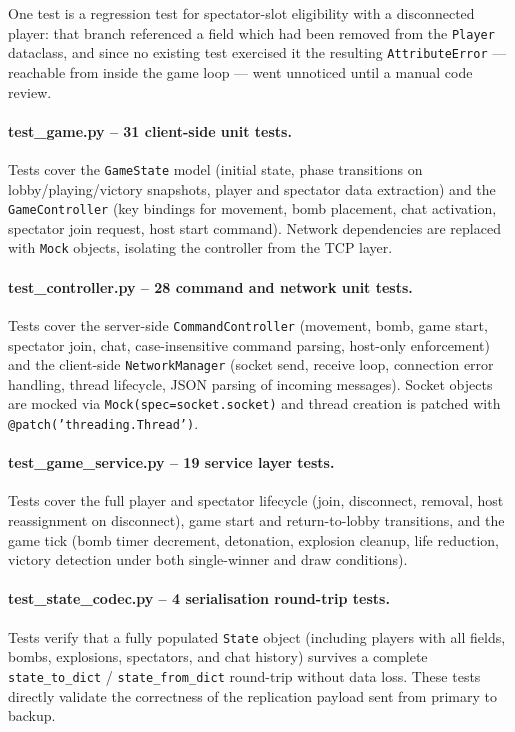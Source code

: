 \documentclass{scrartcl}
\begin{document}
One test is a regression test for spectator-slot eligibility with a disconnected
player: that branch referenced a field which had been removed from the
\texttt{Player} dataclass, and since no existing test exercised it the resulting
\texttt{AttributeError} --- reachable from inside the game loop --- went unnoticed
until a manual code review.

\paragraph{test\_game.py -- 31 client-side unit tests.}
Tests cover the \texttt{GameState} model (initial state, phase transitions on lobby/playing/victory snapshots, player and spectator data extraction) and the \texttt{GameController} (key bindings for movement, bomb placement, chat activation, spectator join request, host start command).
Network dependencies are replaced with \texttt{Mock} objects, isolating the controller from the TCP layer.

\paragraph{test\_controller.py -- 28 command and network unit tests.}
Tests cover the server-side \texttt{CommandController} (movement, bomb, game start, spectator join, chat, case-insensitive command parsing, host-only enforcement) and the client-side \texttt{NetworkManager} (socket send, receive loop, connection error handling, thread lifecycle, JSON parsing of incoming messages).
Socket objects are mocked via \texttt{Mock(spec=socket.socket)} and thread creation is patched with \texttt{@patch('threading.Thread')}.

\paragraph{test\_game\_service.py -- 19 service layer tests.}
Tests cover the full player and spectator lifecycle (join, disconnect, removal, host reassignment on disconnect), game start and return-to-lobby transitions, and the game tick (bomb timer decrement, detonation, explosion cleanup, life reduction, victory detection under both single-winner and draw conditions).

\paragraph{test\_state\_codec.py -- 4 serialisation round-trip tests.}
Tests verify that a fully populated \texttt{State} object (including players with all fields, bombs, explosions, spectators, and chat history) survives a complete \texttt{state\_to\_dict} / \texttt{state\_from\_dict} round-trip without data loss.
These tests directly validate the correctness of the replication payload sent from primary to backup.
\end{document}
